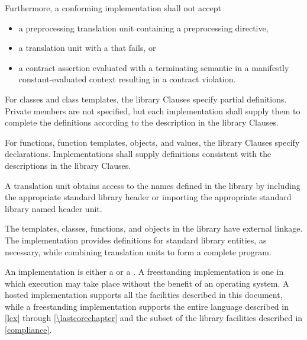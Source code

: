 Furthermore, a conforming implementation
shall not accept
\begin{itemize}
\item
a preprocessing translation unit containing
a  preprocessing directive,
\item
a translation unit with
a  that fails, or
\item
a contract assertion evaluated with a terminating semantic
in a manifestly constant-evaluated context
resulting in a contract violation.
\end{itemize}

\pnum
{}%
%
%
For classes and class templates, the library Clauses specify partial
definitions. Private members are not
specified, but each implementation shall supply them to complete the
definitions according to the description in the library Clauses.

\pnum
For functions, function templates, objects, and values, the library
Clauses specify declarations. Implementations shall supply definitions
consistent with the descriptions in the library Clauses.

\pnum
A \Cpp{}  translation unit
obtains access to the names defined in the library by
including the appropriate standard library header or importing
the appropriate standard library named header unit.

\pnum
The templates, classes, functions, and objects in the library have
external linkage. The implementation provides
definitions for standard library entities, as necessary, while combining
translation units to form a complete \Cpp{}  program.%

\pnum
An implementation is either a
 or a
.
A freestanding
implementation is one in which execution may take place without the benefit of
an operating system.
A hosted implementation
supports all the facilities described in this document, while
a freestanding implementation
supports the entire \Cpp{} language
described in \ref{lex} through \ref{\lastcorechapter} and
the subset of the library facilities described in \ref{compliance}.

